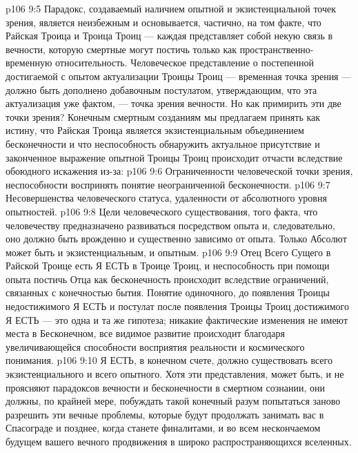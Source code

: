 \vs p106 9:5 \pc Парадокс, создаваемый наличием опытной и экзистенциальной точек зрения, является неизбежным и основывается, частично, на том факте, что Райская Троица и Троица Троиц --- каждая представляет собой некую связь в вечности, которую смертные могут постичь только как пространственно\hyp{}временную относительность. Человеческое представление о постепенной достигаемой с опытом актуализации Троицы Троиц --- временная точка зрения --- должно быть дополнено добавочным постулатом, утверждающим, что эта актуализация уже  фактом, --- точка зрения вечности. Но как примирить эти две точки зрения? Конечным смертным созданиям мы предлагаем принять как истину, что Райская Троица является экзистенциальным объединением бесконечности и что неспособность обнаружить актуальное присутствие и законченное выражение опытной Троицы Троиц происходит отчасти вследствие обоюдного искажения из\hyp{}за:
\vs p106 9:6 \bibnobreakspace Ограниченности человеческой точки зрения, неспособности воспринять понятие неограниченной бесконечности.
\vs p106 9:7 \bibnobreakspace Несовершенства человеческого статуса, удаленности от абсолютного уровня опытностей.
\vs p106 9:8 \bibnobreakspace Цели человеческого существования, того факта, что человечеству предназначено развиваться посредством опыта и, следовательно, оно должно быть врожденно и существенно зависимо от опыта. Только Абсолют может быть и экзистенциальным, и опытным.
\vs p106 9:9 \pc Отец Всего Сущего в Райской Троице есть Я ЕСТЬ в Троице Троиц, и неспособность при помощи опыта постичь Отца как бесконечность происходит вследствие ограничений, связанных с конечностью бытия. Понятие  одиночного, до появления Троицы недостижимого Я ЕСТЬ и постулат  после появления Троицы Троиц достижимого Я ЕСТЬ --- это одна и та же гипотеза; никакие фактические изменения не имеют места в Бесконечном, все видимое развитие происходит благодаря увеличивающейся способности восприятия реальности и космического понимания.
\vs p106 9:10 Я ЕСТЬ, в конечном счете, должно существовать  всего экзистенциального и  всего опытного. Хотя эти представления, может быть, и не проясняют парадоксов вечности и бесконечности в смертном сознании, они должны, по крайней мере, побуждать такой конечный разум попытаться заново разрешить эти вечные проблемы, которые будут продолжать занимать вас в Спасограде и позднее, когда станете финалитами, и во всем нескончаемом будущем вашего вечного продвижения в широко распространяющихся вселенных.
